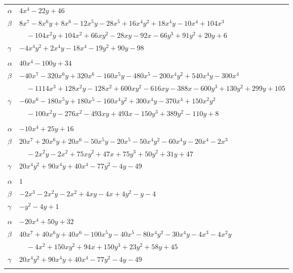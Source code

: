 \documentclass[11pt]{article}
\begin{document}
\begin{longtable}{@{}ll@{}}
$\alpha$ & $4x^{4}-22y+46$\\
$\beta$ & $8x^{7}-8x^{6}y+8x^{6}-12x^{5}y-28x^{5}+16x^{4}y^{2}+18x^{4}y-10x^{4}+104x^{3}$\\
 & $\quad -104x^{2}y+104x^{2}+66xy^{2}-28xy-92x-66y^{3}+91y^{2}+20y+6$\\
$\gamma$ & $-4x^{4}y^{2}+2x^{4}y-18x^{4}-19y^{2}+90y-98$\\
\addlinespace[3pt]
\multicolumn{2}{@{}l}{$\{i,j\}=\{4,14\}$, $k_{ij}=3\cdot 7^{2}$}\\
$\alpha$ & $40x^{4}-100y+34$\\
$\beta$ & $-40x^{7}-320x^{6}y+320x^{6}-160x^{5}y-480x^{5}-200x^{4}y^{2}+540x^{4}y-300x^{4}$\\
 & $\quad -1114x^{3}+128x^{2}y-128x^{2}+600xy^{2}-616xy-388x-600y^{3}+130y^{2}+299y+105$\\
$\gamma$ & $-60x^{6}-180x^{5}y+180x^{5}-160x^{4}y^{2}+300x^{4}y-370x^{4}+150x^{2}y^{2}$\\
 & $\quad -100x^{2}y-276x^{2}-493xy+493x-150y^{3}+389y^{2}-110y+8$\\
\addlinespace[3pt]
\multicolumn{2}{@{}l}{$\{i,j\}=\{5,6\}$, $k_{ij}=2\cdot 3^{2}$}\\
$\alpha$ & $-10x^{4}+25y+16$\\
$\beta$ & $20x^{7}+20x^{6}y+20x^{6}-50x^{5}y-20x^{5}-50x^{4}y^{2}-60x^{4}y-20x^{4}-2x^{3}$\\
 & $\quad -2x^{2}y-2x^{2}+75xy^{2}+47x+75y^{3}+50y^{2}+31y+47$\\
$\gamma$ & $20x^{4}y^{2}+90x^{4}y+40x^{4}-77y^{2}-4y-49$\\
\addlinespace[3pt]
\multicolumn{2}{@{}l}{$\{i,j\}=\{5,7\}$, $k_{ij}=2\cdot 3$}\\
$\alpha$ & $1$\\
$\beta$ & $-2x^{3}-2x^{2}y-2x^{2}+4xy-4x+4y^{2}-y-4$\\
$\gamma$ & $-y^{2}-4y+1$\\
\addlinespace[3pt]
\multicolumn{2}{@{}l}{$\{i,j\}=\{5,12\}$, $k_{ij}=2^{2}\cdot 3^{2}$}\\
$\alpha$ & $-20x^{4}+50y+32$\\
$\beta$ & $40x^{7}+40x^{6}y+40x^{6}-100x^{5}y-40x^{5}-80x^{4}y^{2}-30x^{4}y-4x^{3}-4x^{2}y$\\
 & $\quad -4x^{2}+150xy^{2}+94x+150y^{3}+23y^{2}+58y+45$\\
$\gamma$ & $20x^{4}y^{2}+90x^{4}y+40x^{4}-77y^{2}-4y-49$\\
\addlinespace[3pt]
\multicolumn{2}{@{}l}{$\{i,j\}=\{6,7\}$, $k_{ij}=2\cdot 3\cdot 17^{2}$}\\

\end{longtable}
\end{document}

